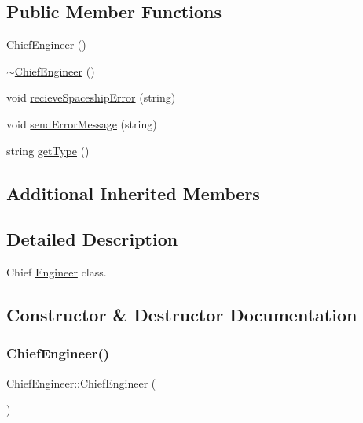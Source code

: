 \subsection*{Public Member Functions}
\begin{DoxyCompactItemize}
\item 
\hyperlink{classChiefEngineer_a4bd0e5f9075ad0ac1a15047c152fe2cb}{Chief\+Engineer} ()
\item 
\hyperlink{classChiefEngineer_aa647c8d8f2d872dc3838211725fd05db}{$\sim$\+Chief\+Engineer} ()
\item 
void \hyperlink{classChiefEngineer_a7170ae93d7eadc1a68bc86c25a9be0db}{recieve\+Spaceship\+Error} (string)
\item 
void \hyperlink{classChiefEngineer_afe5a4677f7651fff2926c0583875a666}{send\+Error\+Message} (string)
\item 
string \hyperlink{classChiefEngineer_abd3df4d2f94acff4c659f9e428ad1789}{get\+Type} ()
\end{DoxyCompactItemize}
\subsection*{Additional Inherited Members}


\subsection{Detailed Description}
Chief \hyperlink{classEngineer}{Engineer} class. 

\subsection{Constructor \& Destructor Documentation}
\mbox{\label{classChiefEngineer_a4bd0e5f9075ad0ac1a15047c152fe2cb}} 
\subsubsection{\texorpdfstring{Chief\+Engineer()}{ChiefEngineer()}}
{\footnotesize\ttfamily Chief\+Engineer\+::\+Chief\+Engineer (\begin{DoxyParamCaption}{ }\end{DoxyParamCaption})\hspace{0.3cm}{\ttfamily [inline]}}

